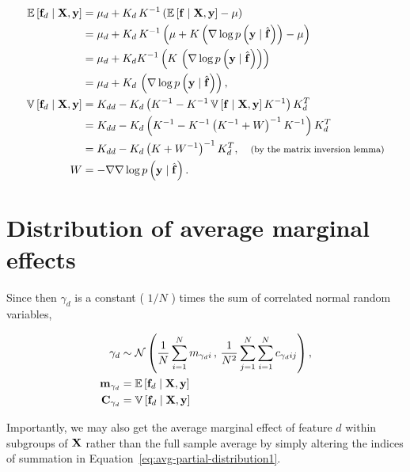 \documentclass{draft}
\newcommand{\pd}{\ensuremath{\partial \,}}     %
\newcommand{\gradient}{\ensuremath{\mathbf{f}_d}} %
\begin{document}
\begin{align}
    \E \left[ \gradient \mid \mbf{X}, \mbf{y} \right]
    & = \mu_d + K_d \, K^{-1} \left( \E \left[ \mbf{f} \mid \mbf{X}, \mbf{y} \right] - \mu \right) \\
    & = \mu_d + K_d \, K^{-1}
        \left( \mu + K \left( \nabla \log p \left( \mbf{y} \mid \hat{\mbf{f}} \right) \right) - \mu \right) \\
    & = \mu_d + K_d K^{-1} \left( K \, \left( \nabla \log p \left( \mbf{y} \mid \hat{\mbf{f}} \right) \right) \right) \\
    & = \mu_d + K_d \, \left( \nabla \log p \left( \mbf{y} \mid \hat{\mbf{f}} \right) \right), \\
    \V \left[ \gradient \mid \mbf{X}, \mbf{y} \right]
    & = 
    K_{dd} - K_d \left( K^{-1} - K^{-1} \V \left[ \mbf{f} \mid \mbf{X}, \mbf{y} \right] K^{-1} \right) K_d^T \\
    & = 
    K_{dd} - K_d \left( K^{-1} - K^{-1} \left( K^{-1} + W \right)^{-1} K^{-1} \right) K_d^T \\
    & = 
    K_{dd} - K_d \left( K + W^{-1} \right)^{-1} K_d^T, \hspace*{1em}\text{\footnotesize(by the matrix inversion lemma)} \\
    W & = -\nabla\nabla \log p \left( \mbf{y} \mid \hat{\mbf{f}} \right).
\end{align}

\section{Distribution of average marginal effects}

Since then \( \gamma_d \) is a constant ( \( 1/N \) ) times the sum of correlated normal random variables,

\begin{align}
    \gamma_d
    & \sim
    \N \left(
        \dfrac{1}{N} \sum_{i=1}^N m_{\gamma_d i} \, , \,
        \dfrac{1}{N^2} \sum_{j=1}^N \sum_{i=1}^N c_{\gamma_d ij}
    \right), \label{eq:avg-partial-distribution1} \\
    \mbf{m}_{\gamma_d} & = \E \left[ \gradient \mid \mbf{X}, \mbf{y} \right] \\
    \mbf{C}_{\gamma_d} & = \V \left[ \gradient \mid \mbf{X}, \mbf{y} \right]
\end{align}

\noindent
Importantly, we may also get the average marginal effect of feature \( d \) within subgroups of \( \mathbf{X} \)
rather than the full sample average by simply altering the indices of summation in
Equation~\ref{eq:avg-partial-distribution1}.
\end{document}
